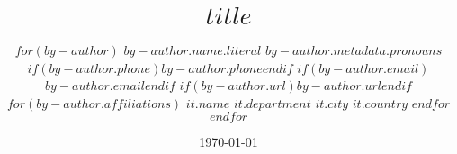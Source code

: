 \title{ \vspace{-1.5em}
\bf $title$ \vspace{-.5em}
}
\author{
  $for(by-author)$
    {$by-author.name.literal$ }
    \authorcr %
    $by-author.metadata.pronouns$
    \authorcr
    $if(by-author.phone)${$by-author.phone$}{}$endif$
    \authorcr
    $if(by-author.email)$\href{mailto:$by-author.email$}{$by-author.email$}$endif$
    \authorcr
    $if(by-author.url)$\href{$by-author.url$}{$by-author.url$}$endif$
    

    $for(by-author.affiliations)$
      $it.name$
      \authorcr
      $it.department$
      \authorcr
      $it.city$ $it.country$
    $endfor$
  $endfor$
  \date{\vspace{-1em}\today}
  }



